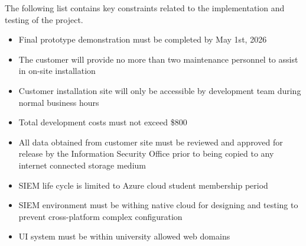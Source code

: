 The following list contains key constraints related to the implementation and testing of the project.

\begin{itemize}
  \item Final prototype demonstration must be completed by May 1st, 2026
  \item The customer will provide no more than two maintenance personnel to assist in on-site installation
  \item Customer installation site will only be accessible by development team during normal business hours
  \item Total development costs must not exceed \$800
  \item All data obtained from customer site must be reviewed and approved for release by the Information Security Office prior to being copied to any internet connected storage medium
  \item SIEM life cycle is limited to Azure cloud student membership period
  \item SIEM environment must be withing native cloud for designing and testing to prevent cross-platform complex configuration
  \item UI system must be within university allowed web domains
\end{itemize}
